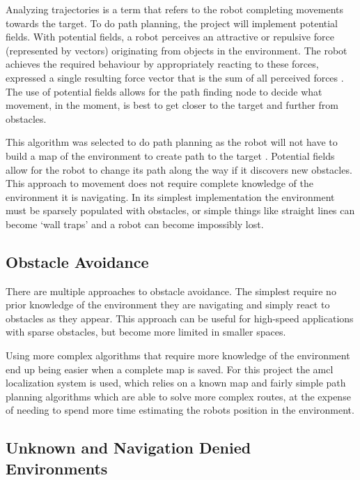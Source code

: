\documentclass{article}[12]
\begin{document}
	Analyzing trajectories is a term that refers to the robot completing movements towards the target.
To do path planning, the project will implement potential fields. With potential fields, a robot perceives an attractive or repulsive force (represented by vectors) originating from objects in the environment. The robot achieves the required behaviour by appropriately  reacting to these forces, expressed a single resulting force vector that is the sum of all perceived forces \cite{hwang1992potential}.
The use of potential fields allows for the path finding node to decide what movement, in the moment, is best to get closer to the target and further from obstacles.  
 
This algorithm was selected to do path planning as the robot will not have to build a map of the environment to create path to the target \cite{bortoff2000path}. Potential fields allow for the robot to change its path along the way if it discovers new obstacles. This approach to movement does not require complete knowledge of the environment it is navigating. In its simplest implementation the environment must be sparsely populated with obstacles, or simple things like straight lines can become `wall traps' and a robot can become impossibly lost.

	\subsection{Obstacle Avoidance}
	
	There are multiple approaches to obstacle avoidance. The simplest require no prior knowledge of the environment they are navigating and simply react to obstacles as they appear. This approach can be useful for high-speed applications with sparse obstacles, \cite{barry2018high} but become more limited in smaller spaces.
	
	Using more complex algorithms that require more knowledge of the environment end up being easier when a complete map is saved. For this project the amcl localization system is used, which relies on a known map and fairly simple path planning algorithms which are able to solve more complex routes, at the expense of needing to spend more time estimating the robots position in the environment.\cite{doucet_freitas_gordon_2001}

	\subsection{Unknown and Navigation Denied Environments}
\end{document}
